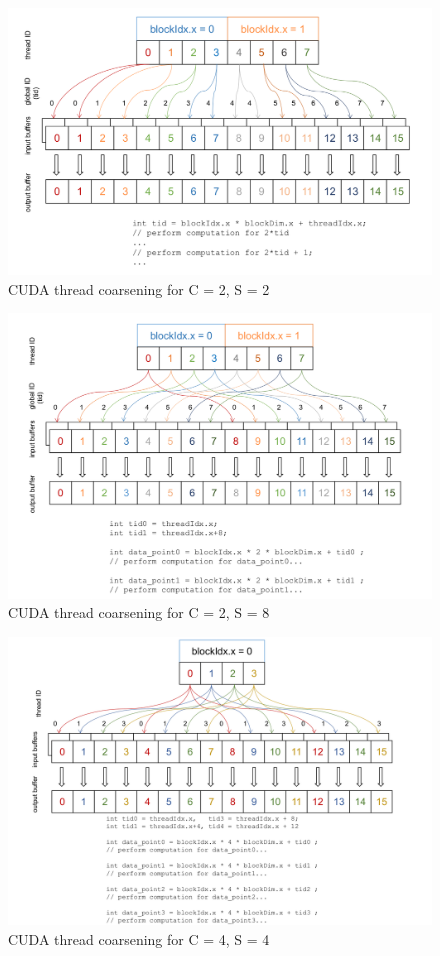\begin{figure}[ht]
	\centering
	\includegraphics[scale=0.35]{Pictures/ch3/coarsen_2C2S.png}
	\caption{\small CUDA thread coarsening for C = 2, S = 2}
\end{figure}

\begin{figure}[ht]
	\centering
	\includegraphics[scale=0.35]{Pictures/ch3/coarsen_2C8S.png}
	\caption{\small CUDA thread coarsening for C = 2, S = 8}
\end{figure}


\begin{figure}[ht]
	\centering
	\includegraphics[scale=0.35]{Pictures/ch3/coarsen_4C4S.png}
	\caption{\small CUDA thread coarsening for C = 4, S = 4}
\end{figure}

